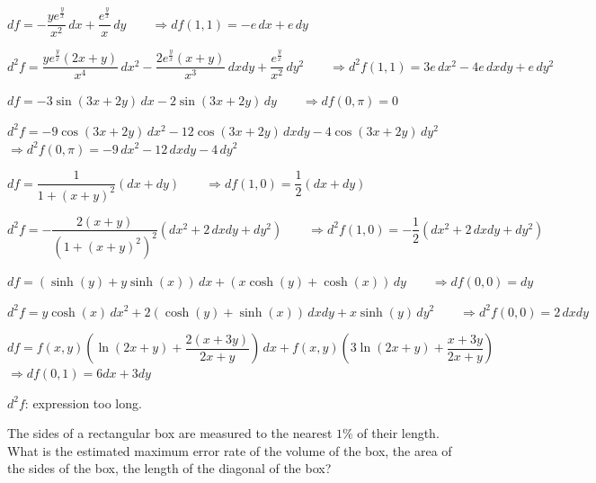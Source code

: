 \begin{Answer}
    
    \Question $df =  -\dfrac{ye^\frac{y}{x}}{x^2} \, dx + \dfrac{e^\frac{y}{x}}{x} \, dy \qquad \Rightarrow df(1,1) = -e\,dx+e\,dy$
    \ifanalysis
   
    $d^2 f = \dfrac{ye^\frac{y}{x} (2x+y)}{x^4} \, dx^2 -\dfrac{2e^\frac{y}{x} (x+y)}{x^3}\, dxdy +\dfrac{e^\frac{y}{x}}{x^2} \, dy^2 \qquad \Rightarrow d^2 f(1,1) = 3e \, dx^2 -4e \, dxdy +e\, dy^2$
    \fi
    
    \Question $df = -3\sin\left(3x+2y\right) \, dx  -2\sin\left(3x+2y\right) \, dy \qquad \Rightarrow df(0, \pi) =0$
    \ifanalysis
    
     $d^2 f =  -9\cos(3x+2y)  \, dx^2 -12\cos(3x+2y)\, dxdy -4\cos(3x+2y)\, dy^2$ \\[0.2cm] 
    $\Rightarrow d^2 f(0, \pi)= -9\, dx^2 -12 \, dxdy -4\, dy^2$
    \fi
    
    \Question $df = \dfrac{1}{1+(x+y)^2} (dx + dy) \qquad \Rightarrow df(1,0) = \dfrac{1}{2}(dx+dy) $
    \ifanalysis
    
     $d^2 f = -\dfrac{2(x+y)}{\left(1+(x+y)^2\right)^2}\left(dx^2 + 2\, dxdy +  dy^2\right) \qquad \Rightarrow d^2f(1,0) = -\dfrac{1}{2}\left(dx^2 + 2\, dxdy + dy^2\right)$
    \fi
    
    \ifanalysis
    \Question $df = \left(\sinh(y) + y\sinh (x)\right)\,dx + \left(x\cosh(y) + \cosh (x)\right)\,dy \qquad \Rightarrow df(0,0) = dy $
    
    $d^2 f =  y\cosh (x)\,dx^2 + 2\left(\cosh (y) + \sinh (x)\right)\, dxdy +  x\sinh (y)\, dy^2 \qquad \Rightarrow d^2f(0,0) =  2\, dxdy $
    \fi
    
    \Question $df = f(x,y)\left(\ln(2x+y)+\dfrac{2(x+3y)}{2x+y}\right)\, dx + f(x,y)\left(3\ln(2x+y)+\dfrac{x+3y}{2x+y}\right)$ \\[0.2cm]
    $\Rightarrow df(0,1)  = 6 dx +3dy$ 
    \ifanalysis
    
    $d^2 f$: expression too long. 
    \fi
    
    
\end{Answer}

\ifanalysis\begin{Exercise}[difficulty = 2]\fi\ifcalculus\begin{Exercise}[difficulty = 3]\fi The sides of a rectangular box are measured to the nearest $1\%$ of their length. What is the estimated maximum error rate of
\Question the volume of the box,
\Question the area of the sides of the box,
\Question the length of the diagonal of the box?
\ifanalysis\end{Exercise}\fi\ifcalculus\end{Exercise}\fi

